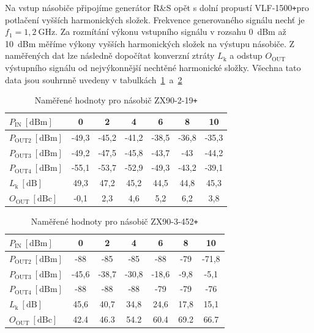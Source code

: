 \documentclass[11pt,a4paper]{article}
\newcommand{\plus}{{\texttt{+}}}
\begin{document}
Na vstup násobiče připojíme generátor R\&S opět s dolní propustí VLF-1500\plus pro potlačení vyšších harmonických složek. Frekvence generovaného signálu nechť je $f_1 = 1,2 \ \mathrm{GHz}$. Za rozmítání výkonu vstupního signálu v rozsahu 0~dBm až 10~dBm měříme výkony vyšších harmonických složek na výstupu násobiče. Z naměřených dat lze následně dopočítat konverzní ztráty $L_{\mathrm k}$ a odstup $O_{\mathrm{OUT}}$ výstupního signálu od nejvýkonnější nechtěné harmonické složky. Všechna tato data jsou souhrnně uvedeny v tabulkách~\ref{table:task4-data_ZX90-2-19+}~a~\ref{table:task4-data_ZX90-3-452+}
\begin{table}[!ht]
    \centering
    \begin{tabular}{| l || c | c | c | c | c | c |}
        \hline
        $P_{\mathrm{IN}} \ [\mathrm{dBm}]$ & 0 & 2 & 4 & 6 & 8 & 10\\
        \hline\hline
        $P_{\mathrm{OUT2}} \ [\mathrm{dBm}]$ & -49,3 & -45,2 & -41,2 & -38,5 & -36,8 & -35,3\\
        \hline
        $P_{\mathrm{OUT3}} \ [\mathrm{dBm}]$ & -49,2 & -47,5 & -45,8 & -43,7 & -43 & -44,2\\
        \hline
        $P_{\mathrm{OUT4}} \ [\mathrm{dBm}]$ & -55,1 & -53,7 & -52,9 & -49,3 & -43,2 & -39,1\\
        \hline\hline
        $L_{\mathrm{k}} \ [\mathrm{dB}]$ & 49,3 & 47,2 & 45,2 & 44,5 & 44,8 & 45,3\\
        \hline
        $O_{\mathrm{OUT}} \ [\mathrm{dBc}]$ & -0,1 & 2,3 & 4,6 & 5,2 & 6,2 & 3,8\\
        \hline
    \end{tabular}
    \caption{Naměřené hodnoty pro násobič ZX90-2-19\plus}
    \label{table:task4-data_ZX90-2-19+}
\end{table}
\begin{table}[!ht]
    \centering
    \begin{tabular}{| l || c | c | c | c | c | c |}
        \hline
        $P_{\mathrm{IN}} \ [\mathrm{dBm}]$ & 0 & 2 & 4 & 6 & 8 & 10\\
        \hline\hline
        $P_{\mathrm{OUT2}} \ [\mathrm{dBm}]$ & -88 & -85 & -85 & -88 & -79 & -71,8\\
        \hline
        $P_{\mathrm{OUT3}} \ [\mathrm{dBm}]$ & -45,6 & -38,7 & -30,8 & -18,6 & -9,8 & -5,1\\
        \hline
        $P_{\mathrm{OUT4}} \ [\mathrm{dBm}]$ & -88 & -88 & -88 & -79 & -79 & -76\\
        \hline\hline
        $L_{\mathrm{k}} \ [\mathrm{dB}]$ & 45,6 & 40,7 & 34,8 & 24,6 & 17,8 & 15,1\\
        \hline
        $O_{\mathrm{OUT}} \ [\mathrm{dBc}]$ & 42.4 & 46.3 & 54.2 & 60.4 & 69.2 & 66.7\\
        \hline
    \end{tabular}
    \caption{Naměřené hodnoty pro násobič ZX90-3-452\plus}
    \label{table:task4-data_ZX90-3-452+}
\end{table}
\end{document}
